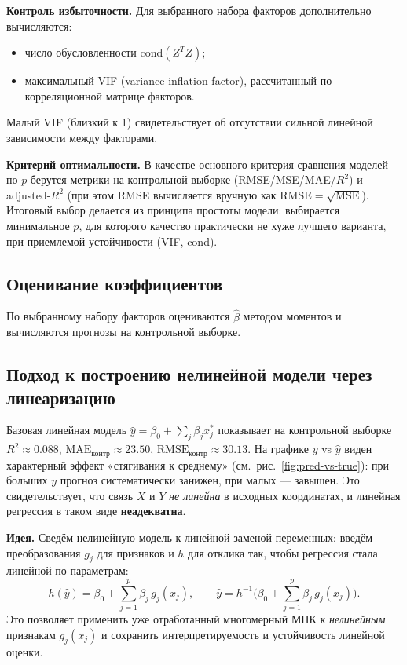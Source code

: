 \documentclass[a4paper, 14pt]{extarticle}
\begin{document}
\medskip
\textbf{Контроль избыточности.} Для выбранного набора факторов дополнительно вычисляются:
\begin{itemize}
  \item число обусловленности $\mathrm{cond}(Z^TZ)$;
  \item максимальный VIF (variance inflation factor), рассчитанный по корреляционной матрице факторов.
\end{itemize}
Малый VIF (близкий к 1) свидетельствует об отсутствии сильной линейной зависимости между факторами.

\medskip
\textbf{Критерий оптимальности.} В качестве основного критерия сравнения моделей по $p$ берутся метрики на контрольной выборке (RMSE/MSE/MAE/$R^2$) и adjusted-$R^2$ (при этом RMSE вычисляется вручную как $\mathrm{RMSE}=\sqrt{\mathrm{MSE}}$). Итоговый выбор делается из принципа простоты модели: выбирается минимальное $p$, для которого качество практически не хуже лучшего варианта, при приемлемой устойчивости (VIF, cond).

\subsection{Оценивание коэффициентов}
По выбранному набору факторов оцениваются $\hat{\beta}$ методом моментов и вычисляются прогнозы
на контрольной выборке.

\subsection{Подход к построению нелинейной модели через линеаризацию}\label{sec:nl-approach}

Базовая линейная модель $\hat y = \beta_0 + \sum_j \beta_j x_j^{*}$ показывает на контрольной выборке
$R^2 \approx 0.088$, $\mathrm{MAE}_{\text{контр}}\approx 23.50$, $\mathrm{RMSE}_{\text{контр}}\approx 30.13$.
На графике $y$ vs $\hat y$ виден характерный эффект «стягивания к среднему» (см.~рис.~\ref{fig:pred-vs-true}):
при больших $y$ прогноз систематически занижен, при малых --- завышен. Это свидетельствует, что связь
$X$ и $Y$ \textit{не линейна} в исходных координатах, и линейная регрессия в таком виде \textbf{неадекватна}.

\medskip
\textbf{Идея.} Сведём нелинейную модель к линейной заменой переменных: введём преобразования
$g_j$ для признаков и $h$ для отклика так, чтобы регрессия стала линейной по параметрам:
\begin{equation}\label{eq:lin-of-nl}
h(\hat y) = \beta_0 + \sum_{j=1}^{p}\beta_j\, g_j(x_j),\qquad
\hat y = h^{-1}\!\bigg(\beta_0 + \sum_{j=1}^{p}\beta_j\, g_j(x_j)\bigg).
\end{equation}
Это позволяет применить уже отработанный многомерный МНК к \textit{нелинейным} признакам $g_j(x_j)$ и сохранить
интерпретируемость и устойчивость линейной оценки.
\end{document}

